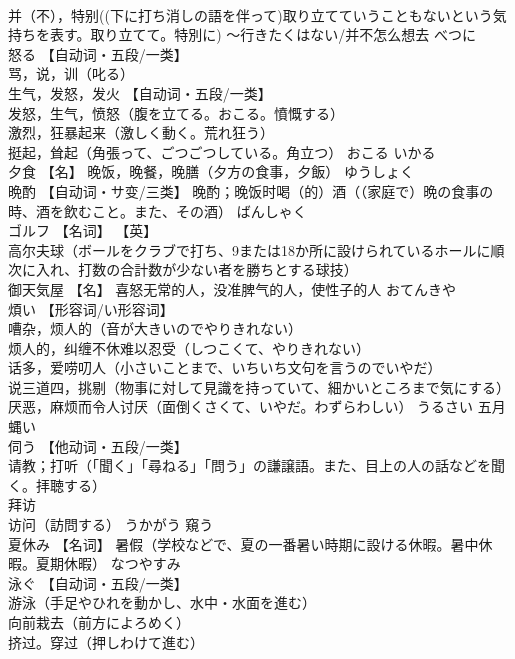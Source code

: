 \documentclass[8pt]{extreport}
\begin{document}
\begin{CJK}{UTF8}{min}
\\	并（不），特别((下に打ち消しの語を伴って)取り立てていうこともないという気持ちを表す。取り立てて。特別に) 〜行きたくはない/并不怎么想去	べつに	
\\	怒る	【自动词・五段/一类】 
\\	骂，说，训（叱る） 
\\	生气，发怒，发火 【自动词・五段/一类】 
\\	发怒，生气，愤怒（腹を立てる。おこる。憤慨する） 
\\	激烈，狂暴起来（激しく動く。荒れ狂う） 
\\	挺起，耸起（角張って、ごつごつしている。角立つ）	おこる いかる	
\\	夕食	【名】 晚饭，晚餐，晚膳（夕方の食事，夕飯）	ゆうしょく	
\\	晩酌	【自动词・サ变/三类】 晚酌；晚饭时喝（的）酒（（家庭で）晩の食事の時、酒を飲むこと。また、その酒）	ばんしゃく	
\\	ゴルフ	【名词】 【英】
\\	高尔夫球（ボールをクラブで打ち、9または18か所に設けられているホールに順次に入れ、打数の合計数が少ない者を勝ちとする球技）		
\\	御天気屋	【名】 喜怒无常的人，没准脾气的人，使性子的人	おてんきや	
\\	煩い	【形容词/い形容词】 
\\	嘈杂，烦人的（音が大きいのでやりきれない） 
\\	烦人的，纠缠不休难以忍受（しつこくて、やりきれない） 
\\	话多，爱唠叨人（小さいことまで、いちいち文句を言うのでいやだ） 
\\	说三道四，挑剔（物事に対して見識を持っていて、細かいところまで気にする） 
\\	厌恶，麻烦而令人讨厌（面倒くさくて、いやだ。わずらわしい）	うるさい	五月蝿い
\\	伺う	【他动词・五段/一类】 
\\	请教；打听（「聞く」「尋ねる」「問う」の謙譲語。また、目上の人の話などを聞く。拝聴する） 
\\	拜访 
\\	访问（訪問する）	うかがう	窺う
\\	夏休み	【名词】 暑假（学校などで、夏の一番暑い時期に設ける休暇。暑中休暇。夏期休暇）	なつやすみ	
\\	泳ぐ	【自动词・五段/一类】 
\\	游泳（手足やひれを動かし、水中・水面を進む） 
\\	向前栽去（前方によろめく） 
\\	挤过。穿过（押しわけて進む） 

\end{CJK}
\end{document}
